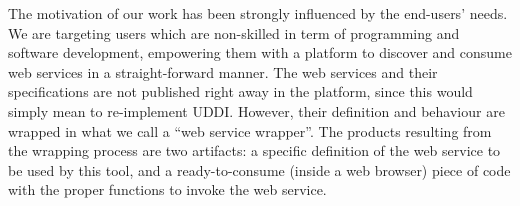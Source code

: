 The motivation of our work has been strongly influenced by the end-users' needs. We are targeting users which are non-skilled in term of programming and software development, empowering them with a platform to discover and consume web services in a straight-forward manner.
The web services and their specifications are not published right away in the platform, since this would simply mean to re-implement UDDI.
However, their definition and behaviour are wrapped in what we call a ``web service wrapper''. The products resulting from the wrapping process are two artifacts: a specific definition of the web service to be used by this tool, and a ready-to-consume (inside a web browser) piece of code with the proper functions to invoke the web service.


